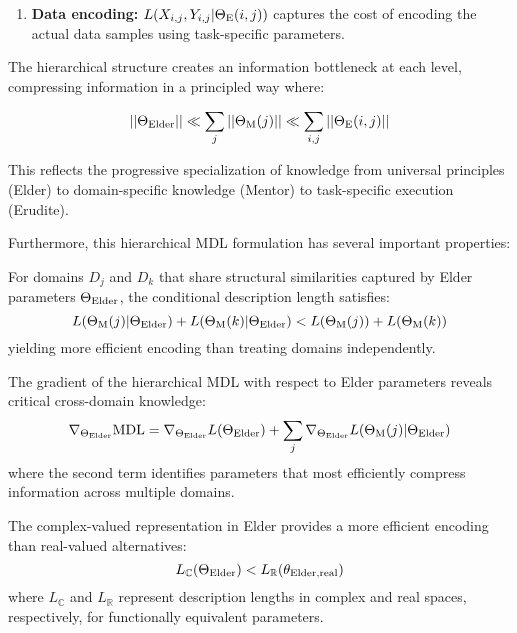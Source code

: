 \begin{theorem}
\begin{enumerate}
    \item \textbf{Data encoding:} $L(X_{i,j}, Y_{i,j} | \Theta_{\text{E}}(i,j))$ captures the cost of encoding the actual data samples using task-specific parameters.
\end{enumerate}

The hierarchical structure creates an information bottleneck at each level, compressing information in a principled way where:

\begin{align}
    ||\Theta_{\text{Elder}}|| \ll \sum_j ||\Theta_{\text{M}}(j)|| \ll \sum_{i,j} ||\Theta_{\text{E}}(i,j)||
\end{align}

This reflects the progressive specialization of knowledge from universal principles (Elder) to domain-specific knowledge (Mentor) to task-specific execution (Erudite).

Furthermore, this hierarchical MDL formulation has several important properties:

\begin{corollary}
\label{cor:efficient_transfer}
For domains $D_j$ and $D_k$ that share structural similarities captured by Elder parameters $\Theta_{\text{Elder}}$, the conditional description length satisfies:
\begin{equation}
    L(\Theta_{\text{M}}(j) | \Theta_{\text{Elder}}) + L(\Theta_{\text{M}}(k) | \Theta_{\text{Elder}}) < L(\Theta_{\text{M}}(j)) + L(\Theta_{\text{M}}(k))
\end{equation}
yielding more efficient encoding than treating domains independently.
\end{corollary}

\begin{corollary}
\label{cor:information_gradients}
The gradient of the hierarchical MDL with respect to Elder parameters reveals critical cross-domain knowledge:
\begin{equation}
    \nabla_{\Theta_{\text{Elder}}}\text{MDL} = \nabla_{\Theta_{\text{Elder}}}L(\Theta_{\text{Elder}}) + \sum_j \nabla_{\Theta_{\text{Elder}}}L(\Theta_{\text{M}}(j) | \Theta_{\text{Elder}})
\end{equation}
where the second term identifies parameters that most efficiently compress information across multiple domains.
\end{corollary}

\begin{corollary}
\label{cor:complex_compression}
The complex-valued representation in Elder provides a more efficient encoding than real-valued alternatives:
\begin{equation}
    L_{\mathbb{C}}(\Theta_{\text{Elder}}) < L_{\mathbb{R}}(\theta_{\text{Elder,real}})
\end{equation}
where $L_{\mathbb{C}}$ and $L_{\mathbb{R}}$ represent description lengths in complex and real spaces, respectively, for functionally equivalent parameters.
\end{corollary}


\end{theorem}
